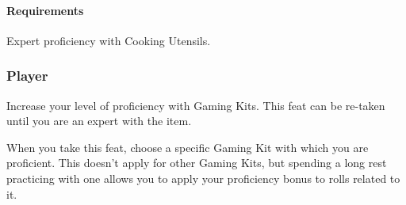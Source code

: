     \paragraph{Requirements} Expert proficiency with Cooking Utensils.

\subsubsection{Player} \label{feat::player}
    Increase your level of proficiency with Gaming Kits.
    This feat can be re-taken until you are an expert with the item.

    When you take this feat, choose a specific Gaming Kit with which you are proficient.
    This doesn't apply for other Gaming Kits, but spending a long rest practicing with one allows you to apply your proficiency bonus to rolls related to it.

